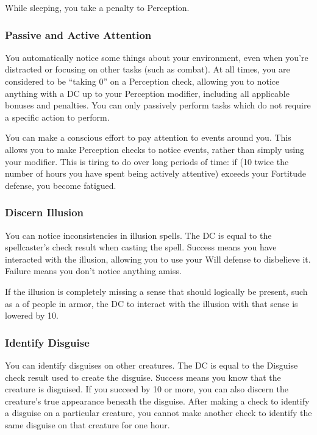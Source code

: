 While sleeping, you take a  penalty to Perception.

\subsubsection{Passive and Active Attention}\label{Perception:Passive and Active Attention}
You automatically notice some things about your environment, even when you're distracted or focusing on other tasks (such as combat). At all times, you are considered to be ``taking 0'' on a Perception check, allowing you to notice anything with a DC up to your Perception modifier, including all applicable bonuses and penalties. You can only passively perform tasks which do not require a specific action to perform.

You can make a conscious effort to pay attention to events around you. This allows you to make Perception checks to notice events, rather than simply using your modifier. This is tiring to do over long periods of time: if (10 \add twice the number of hours you have spent being actively attentive) exceeds your Fortitude defense, you become fatigued.

\subsubsection{Discern Illusion}
You can notice inconsistencies in illusion spells. The DC is equal to the spellcaster's check result when casting the spell. Success means you have interacted with the illusion, allowing you to use your Will defense to disbelieve it. Failure means you don't notice anything amiss.

If the illusion is completely missing a sense that should logically be present, such as a  of people in armor, the DC to interact with the illusion with that sense is lowered by 10.

\subsubsection{Identify Disguise}
You can identify disguises on other creatures. The DC is equal to the Disguise check result used to create the disguise. Success means you know that the creature is disguised. If you succeed by 10 or more, you can also discern the creature's true appearance beneath the disguise. After making a check to identify a disguise on a particular creature, you cannot make another check to identify the same disguise on that creature for one hour.

